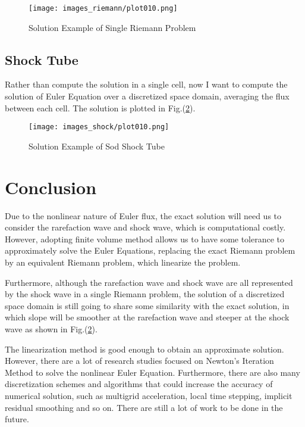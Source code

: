 \documentclass[11pt]{diazessay} %
\begin{document}
\begin{figure}[h!]
    \centering
    \texttt{[image: images\_riemann/plot010.png]}
    \caption{Solution Example of Single Riemann Problem}
    \label{fig:riemann}

\end{figure}


\subsection{Shock Tube}

Rather than compute the solution in a single cell, now I want to compute the solution of Euler Equation over a discretized space domain, averaging the flux between each cell. The solution is plotted in Fig.(\ref{fig:shocktube}).

\begin{figure}[h!]
    \centering
    \texttt{[image: images\_shock/plot010.png]}
    \caption{Solution Example of Sod Shock Tube}
    \label{fig:shocktube}

\end{figure}

\section{Conclusion}

Due to the nonlinear nature of Euler flux, the exact solution will need us to consider the rarefaction wave and shock wave, which is computational costly. However, adopting finite volume method allows us to have some tolerance to approximately solve the Euler Equations, replacing the exact Riemann problem by an equivalent Riemann problem, which linearize the problem.

Furthermore, although the rarefaction wave and shock wave are all represented by the shock wave in a single Riemann problem, the solution of a discretized space domain is still going to share some similarity with the exact solution, in which slope will be smoother at the rarefaction wave and steeper at the shock wave as shown in Fig.(\ref{fig:shocktube}).

The linearization method is good enough to obtain an approximate solution. However, there are a lot of research studies focused on Newton's Iteration Method to solve the nonlinear Euler Equation\cite{li_multigrid_nodate}. Furthermore, there are also many discretization schemes and algorithms that could increase the accuracy of numerical solution, such as multigrid acceleration, local time stepping, implicit residual smoothing and so on\cite{jameson_solution_1983}. There are still a lot of work to be done in the future.

\clearpage



\end{document}
